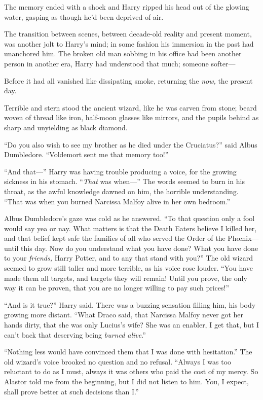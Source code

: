 \later

The memory ended with a shock and Harry ripped his head out of the glowing water, gasping as though he’d been deprived of air.

The transition between scenes, between decade-old reality and present moment, was another jolt to Harry’s mind; in some fashion his immersion in the past had unanchored him. The broken old man sobbing in his office had been another person in another era, Harry had understood that much; someone softer—

Before it had all vanished like dissipating smoke, returning the \emph{now,} the present day.

Terrible and stern stood the ancient wizard, like he was carven from stone; beard woven of thread like iron, half-moon glasses like mirrors, and the pupils behind as sharp and unyielding as black diamond.

“Do you also wish to see my brother as he died under the Cruciatus?” said Albus Dumbledore. “Voldemort sent me that memory too!”

“And that—” Harry was having trouble producing a voice, for the growing sickness in his stomach. “\emph{That} was when—” The words seemed to burn in his throat, as the awful knowledge dawned on him, the horrible understanding. “That was when you burned Narcissa Malfoy alive in her own bedroom.”

Albus Dumbledore’s gaze was cold as he answered. “To that question only a fool would say yea or nay. What matters is that the Death Eaters believe I killed her, and that belief kept safe the families of all who served the Order of the Phœnix—until this day. Now do you understand what you have done? What you have done to your \emph{friends,} Harry Potter, and to any that stand with you?” The old wizard seemed to grow still taller and more terrible, as his voice rose louder. “You have made them all targets, and targets they will remain! Until you prove, the only way it can be proven, that you are no longer willing to pay such prices!”

“And is it true?” Harry said. There was a buzzing sensation filling him, his body growing more distant. “What Draco said, that Narcissa Malfoy never got her hands dirty, that she was only Lucius’s wife? She was an enabler, I get that, but I can’t back that deserving being \emph{burned alive}.”

“Nothing less would have convinced them that I was done with hesitation.” The old wizard’s voice brooked no question and no refusal. “Always I was too reluctant to do as I must, always it was others who paid the cost of my mercy. So Alastor told me from the beginning, but I did not listen to him. You, I expect, shall prove better at such decisions than I.”

